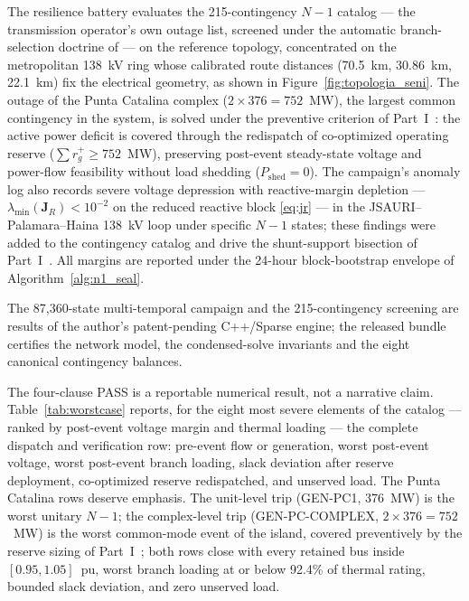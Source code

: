 The resilience battery evaluates the 215-contingency $N-1$ catalog --- the transmission operator's own outage list, screened under the automatic branch-selection doctrine of \cite{ejebe1979} --- on the reference topology, concentrated on the metropolitan 138~kV ring whose calibrated route distances (70.5~km, 30.86~km, 22.1~km) fix the electrical geometry, as shown in Figure~\ref{fig:topologia_seni}. The outage of the Punta Catalina complex ($2 \times 376 = 752$~MW), the largest common contingency in the system, is solved under the preventive criterion of Part~I~\cite{seni142part1}: the active power deficit is covered through the redispatch of co-optimized operating reserve ($\sum r_g^+ \ge 752$~MW), preserving post-event steady-state voltage and power-flow feasibility without load shedding ($P_{\mathrm{shed}} = 0$). The campaign's anomaly log also records severe voltage depression with reactive-margin depletion --- $\lambda_{\min}(\mathbf{J}_R) < 10^{-2}$ on the reduced reactive block \eqref{eq:jr} --- in the JSAURI--Palamara--Haina 138~kV loop under specific $N-1$ states; these findings were added to the contingency catalog and drive the shunt-support bisection of Part~I~\cite{seni142part1}. All margins are reported under the 24-hour block-bootstrap envelope of Algorithm~\ref{alg:n1_seal}.

The 87,360-state multi-temporal campaign and the 215-contingency screening are results of the author's patent-pending C++/Sparse engine; the released bundle certifies the network model, the condensed-solve invariants and the eight canonical contingency balances.

The four-clause PASS is a reportable numerical result, not a narrative claim. Table~\ref{tab:worstcase} reports, for the eight most severe elements of the catalog --- ranked by post-event voltage margin and thermal loading --- the complete dispatch and verification row: pre-event flow or generation, worst post-event voltage, worst post-event branch loading, slack deviation after reserve deployment, co-optimized reserve redispatched, and unserved load. The Punta Catalina rows deserve emphasis. The unit-level trip (GEN-PC1, 376~MW) is the worst unitary $N-1$; the complex-level trip (GEN-PC-COMPLEX, $2 \times 376 = 752$~MW) is the worst common-mode event of the island, covered preventively by the reserve sizing of Part~I~\cite{seni142part1}; both rows close with every retained bus inside $[0.95, 1.05]$~pu, worst branch loading at or below 92.4\% of thermal rating, bounded slack deviation, and zero unserved load. 

